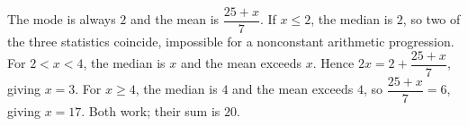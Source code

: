The mode is always $2$ and the mean is $\dfrac{25+x}{7}$. If $x\le2$, the median is $2$, so two of the three statistics coincide, impossible for a nonconstant arithmetic progression. For $2<x<4$, the median is $x$ and the mean exceeds $x$. Hence $2x=2+\dfrac{25+x}{7}$, giving $x=3$. For $x\ge4$, the median is $4$ and the mean exceeds $4$, so $\dfrac{25+x}{7}=6$, giving $x=17$. Both work; their sum is $\boxed{20}$.
